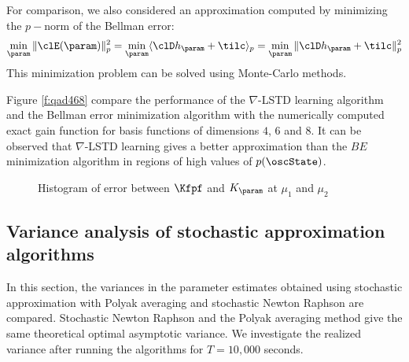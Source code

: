 For comparison, we also considered an approximation computed by minimizing the $p-$norm of the Bellman error:
\begin{align*}
\min_{\param}\|\clE(\param)\|_{p}^{2}=\min_{\param}\langle \clD h_{\param} + \tilc \rangle_{p} = \min_{\param}\|\clD h_{\param} +\tilc \|_{p}^{2}
\end{align*}
This minimization problem can be solved using Monte-Carlo methods.

Figure \ref{f:qad468} compare the performance of the $\nabla$-LSTD learning algorithm and the Bellman error minimization algorithm with the numerically computed exact gain function for basis functions of dimensions $4$, $6$ and $8$. It can be observed that $\nabla$-LSTD learning gives a better approximation than the $BE$ minimization algorithm in regions of high values of $p(\oscState)$.




%
%
%
%

\begin{figure}[h]
	\caption{ Histogram of error between $\Kfpf$ and $K_\param$ at $\mu_{1}$ and $\mu_{2}$ }
	\label{var_snr_1}
	\vspace{-.15cm}
\end{figure}

\subsection{Variance analysis of stochastic approximation algorithms}
\label{asym_variance}
In this section, the variances in the parameter estimates obtained using stochastic approximation with Polyak averaging and stochastic Newton Raphson are compared. Stochastic Newton Raphson and the Polyak averaging method give the same theoretical optimal asymptotic variance. We investigate the realized variance after running the algorithms for $T=10,000$ seconds.

